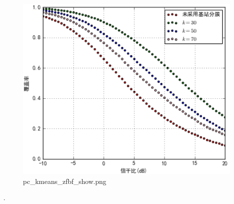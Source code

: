 \documentclass[11pt]{article}
\makeatletter
\def\maxwidth{\ifdim\Gin@nat@width>\linewidth\linewidth
    \else\Gin@nat@width\fi}
\let\Oldincludegraphics\includegraphics
\renewcommand{\includegraphics}[1]{\Oldincludegraphics[width=.8\maxwidth]{#1}}
\makeatother
\begin{document}
\begin{figure}[htbp]
\centering
\includegraphics{pc_kmeans_zfbf_show.png}
\caption{pc\_kmeans\_zfbf\_show.png}
\end{figure}

.





    
\end{document}
